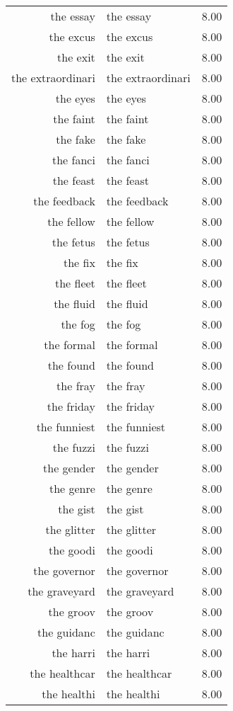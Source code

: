 \begin{table}[ht]
\begin{tabular}{rlr}
  the essay & the essay & 8.00 \\ 
  the excus & the excus & 8.00 \\ 
  the exit & the exit & 8.00 \\ 
  the extraordinari & the extraordinari & 8.00 \\ 
  the eyes & the eyes & 8.00 \\ 
  the faint & the faint & 8.00 \\ 
  the fake & the fake & 8.00 \\ 
  the fanci & the fanci & 8.00 \\ 
  the feast & the feast & 8.00 \\ 
  the feedback & the feedback & 8.00 \\ 
  the fellow & the fellow & 8.00 \\ 
  the fetus & the fetus & 8.00 \\ 
  the fix & the fix & 8.00 \\ 
  the fleet & the fleet & 8.00 \\ 
  the fluid & the fluid & 8.00 \\ 
  the fog & the fog & 8.00 \\ 
  the formal & the formal & 8.00 \\ 
  the found & the found & 8.00 \\ 
  the fray & the fray & 8.00 \\ 
  the friday & the friday & 8.00 \\ 
  the funniest & the funniest & 8.00 \\ 
  the fuzzi & the fuzzi & 8.00 \\ 
  the gender & the gender & 8.00 \\ 
  the genre & the genre & 8.00 \\ 
  the gist & the gist & 8.00 \\ 
  the glitter & the glitter & 8.00 \\ 
  the goodi & the goodi & 8.00 \\ 
  the governor & the governor & 8.00 \\ 
  the graveyard & the graveyard & 8.00 \\ 
  the groov & the groov & 8.00 \\ 
  the guidanc & the guidanc & 8.00 \\ 
  the harri & the harri & 8.00 \\ 
  the healthcar & the healthcar & 8.00 \\ 
  the healthi & the healthi & 8.00 \\ 

\end{tabular}
\end{table}
